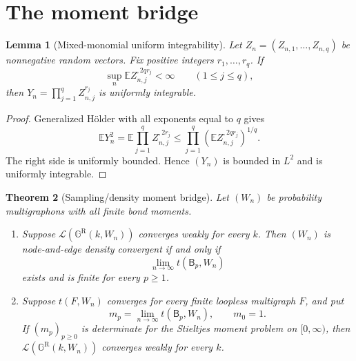 \documentclass[11pt]{article}
\newtheorem{theorem}{Theorem}
\newtheorem{lemma}[theorem]{Lemma}
\theoremstyle{remark}
\newcommand{\Ee}{\mathbb E}
\newcommand{\Law}{\mathcal L}
\newcommand{\Bn}{\mathsf B}
\newcommand{\Gsample}{\mathbb G^{\mathrm R}}
\begin{document}
\section{The moment bridge}

\begin{lemma}[Mixed-monomial uniform integrability]\label{lem:UI}
Let $Z_n=(Z_{n,1},\ldots,Z_{n,q})$ be nonnegative random vectors.  Fix positive
integers $r_1,\ldots,r_q$.  If
\[
 \sup_n \Ee Z_{n,j}^{,2q r_j}<\infty
 \qquad(1\leq j\leq q),
\]
then $Y_n=\prod_{j=1}^q Z_{n,j}^{r_j}$ is uniformly integrable.
\end{lemma}

\begin{proof}
Generalized H\"older with all exponents equal to $q$ gives
\begin{equation}\label{eq:holder}
 \Ee Y_n^2
 =\Ee\prod_{j=1}^q Z_{n,j}^{,2r_j}
 \leq \prod_{j=1}^q
 \left(\Ee Z_{n,j}^{,2q r_j}\right)^{1/q}.
\end{equation}
The right side is uniformly bounded.  Hence $(Y_n)$ is bounded in $L^2$ and
is uniformly integrable.
\end{proof}

\begin{theorem}[Sampling/density moment bridge]\label{thm:bridge}
Let $(W_n)$ be probability multigraphons with all finite bond moments.

\begin{enumerate}[label=\textup{(\roman*)},leftmargin=2.2em]
\item\label{it:forward}
Suppose $\Law(\Gsample(k,W_n))$ converges weakly for every $k$.  Then
$(W_n)$ is node-and-edge density convergent if and only if
\[
 \lim_{n\to\infty}t(\Bn_p,W_n)
\]
exists and is finite for every $p\geq1$.

\item\label{it:reverse}
Suppose $t(F,W_n)$ converges for every finite loopless multigraph $F$, and put
\[
 m_p=\lim_{n\to\infty}t(\Bn_p,W_n),\qquad m_0=1.
\]
If $(m_p)_{p\geq0}$ is determinate for the Stieltjes moment problem on
$[0,\infty)$, then $\Law(\Gsample(k,W_n))$ converges weakly for every $k$.
\end{enumerate}
\end{theorem}
\end{document}

